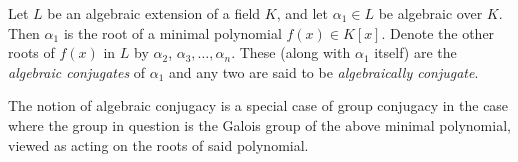 \documentclass[12pt]{article}
\newcommand{\<}{\langle}
\renewcommand{\>}{\rangle}
\begin{document}
Let $L$ be an algebraic extension of a field $K$, and let $\alpha_1\in L$ be algebraic over $K$.  Then $\alpha_1$ is the root of a minimal polynomial $f(x)\in K[x]$.  Denote the other roots of $f(x)$ in $L$ by $\alpha_2$, $\alpha_3, \ldots, \alpha_n$.  These (along with $\alpha_1$ itself) are the \emph{algebraic conjugates} of $\alpha_1$ and any two are said to be \emph{algebraically conjugate}.  

The notion of algebraic conjugacy is a special case of group conjugacy in the case where the group in question is the Galois group of the above minimal polynomial, viewed as acting on the roots of said polynomial.
\end{document}
